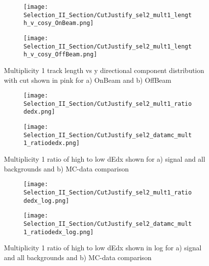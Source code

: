\begin{figure}[h!]
\centering
  \begin{subfigure}[t]{0.25\textwidth}
    \centering
\texttt{[image: Selection\_II\_Section/CutJustify\_sel2\_mult1\_length\_v\_cosy\_OnBeam.png]}
    \caption{ }
  \end{subfigure} 
  \hspace{20mm}
  \begin{subfigure}[t]{0.25\textwidth}
    \centering
    \texttt{[image: Selection\_II\_Section/CutJustify\_sel2\_mult1\_length\_v\_cosy\_OffBeam.png]}
    \caption{ }
  \end{subfigure} 

\caption{Multiplicity 1 track length vs y directional component distribution with cut shown in pink for a) OnBeam and b) OffBeam }
\label{fig:cutjust_sel2_onbeam_mult1_len_v_cosy}
\end{figure}


\begin{figure}[h!]
\centering
  \begin{subfigure}[t]{0.4\textwidth}
    \centering
\texttt{[image: Selection\_II\_Section/CutJustify\_sel2\_mult1\_ratiodedx.png]}
    \caption{ }
  \end{subfigure} 
  \hspace{20mm}
  \begin{subfigure}[t]{0.4\textwidth}
    \centering
\texttt{[image: Selection\_II\_Section/CutJustify\_sel2\_datamc\_mult1\_ratiodedx.png]}
    \caption{ }
  \end{subfigure} 
\caption{Multiplicity 1 ratio of high to low dEdx shown for a) signal and all backgrounds and b) MC-data comparison }
\label{fig:cutjust_sel2_mult1_ratiodedx}
\end{figure}

\begin{figure}[h!]
\centering
  \begin{subfigure}[t]{0.4\textwidth}
    \centering
\texttt{[image: Selection\_II\_Section/CutJustify\_sel2\_mult1\_ratiodedx\_log.png]}
    \caption{ }
  \end{subfigure} 
  \hspace{20mm}
  \begin{subfigure}[t]{0.4\textwidth}
    \centering
\texttt{[image: Selection\_II\_Section/CutJustify\_sel2\_datamc\_mult1\_ratiodedx\_log.png]}
   \caption{ }
  \end{subfigure} 
\caption{Multiplicity 1 ratio of high to low dEdx shown in log for a) signal and all backgrounds and b) MC-data comparison }
\label{fig:cutjust_sel2_mult1_ratiodedx_log}
\end{figure}


